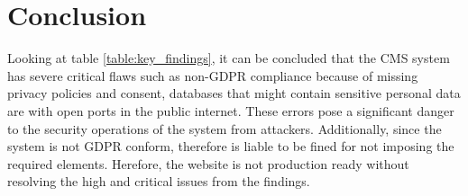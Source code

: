 \section{Conclusion}
Looking at table \ref{table:key_findings}, it can be concluded that the CMS system has severe critical flaws such as non-GDPR compliance because of missing privacy policies and consent, databases that might contain sensitive personal data are with open ports in the public internet. These errors pose a significant danger to the security operations of the system from attackers. Additionally, since the system is not GDPR conform, therefore is liable to be fined for not imposing the required elements. Herefore, the website is not production ready without resolving the high and critical issues from the findings.